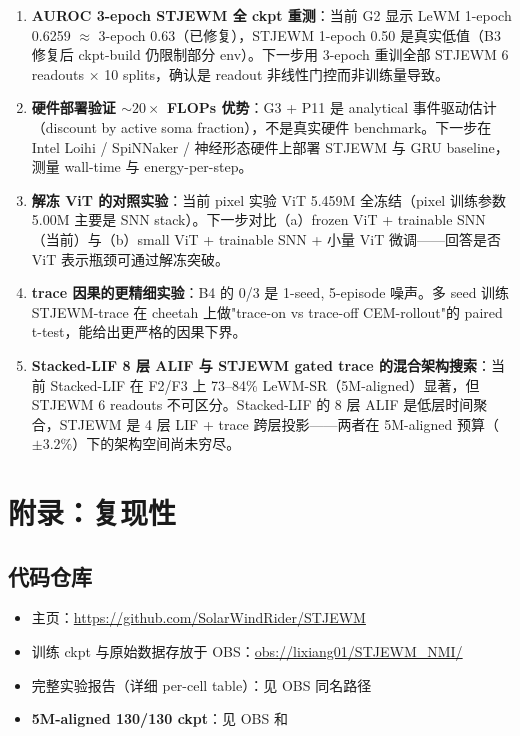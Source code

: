 \documentclass[11pt,a4paper]{article}
\begin{document}
\begin{enumerate}[leftmargin=2em]
    \item \textbf{AUROC 3-epoch STJEWM 全 ckpt 重测}：当前 G2 显示 LeWM 1-epoch 0.6259 $\approx$ 3-epoch 0.63（已修复），STJEWM 1-epoch 0.50 是真实低值（B3 修复后 ckpt-build 仍限制部分 env）。下一步用 3-epoch 重训全部 STJEWM 6 readouts × 10 splits，确认是 readout 非线性门控而非训练量导致。
    \item \textbf{硬件部署验证 $\sim 20\times$ FLOPs 优势}：G3 + P11 是 analytical 事件驱动估计（discount by active soma fraction），不是真实硬件 benchmark。下一步在 Intel Loihi / SpiNNaker / 神经形态硬件上部署 STJEWM 与 GRU baseline，测量 wall-time 与 energy-per-step。
    \item \textbf{解冻 ViT 的对照实验}：当前 pixel 实验 ViT 5.459M 全冻结（pixel 训练参数 5.00M 主要是 SNN stack）。下一步对比（a）frozen ViT + trainable SNN（当前）与（b）small ViT + trainable SNN + 小量 ViT 微调——回答是否 ViT 表示瓶颈可通过解冻突破。
    \item \textbf{trace 因果的更精细实验}：B4 的 0/3 是 1-seed, 5-episode 噪声。多 seed 训练 STJEWM-trace 在 cheetah 上做"trace-on vs trace-off CEM-rollout"的 paired t-test，能给出更严格的因果下界。
    \item \textbf{Stacked-LIF 8 层 ALIF 与 STJEWM gated trace 的混合架构搜索}：当前 Stacked-LIF 在 F2/F3 上 73--84\% LeWM-SR（5M-aligned）显著，但 STJEWM 6 readouts 不可区分。Stacked-LIF 的 8 层 ALIF 是低层时间聚合，STJEWM 是 4 层 LIF + trace 跨层投影——两者在 5M-aligned 预算（$\pm 3.2\%$）下的架构空间尚未穷尽。
\end{enumerate}

\section{附录：复现性}

\subsection{代码仓库}

\begin{itemize}[leftmargin=2em]
    \item 主页：\url{https://github.com/SolarWindRider/STJEWM}
    \item 训练 ckpt 与原始数据存放于 OBS：\url{obs://lixiang01/STJEWM_NMI/}
    \item 完整实验报告（详细 per-cell table）：见 OBS 同名路径
    \item \textbf{5M-aligned 130/130 ckpt}：见 OBS  和 
\end{itemize}
\end{document}
